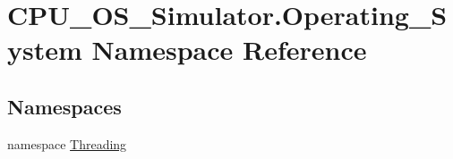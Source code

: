 \hypertarget{namespace_c_p_u___o_s___simulator_1_1_operating___system}{}\section{C\+P\+U\+\_\+\+O\+S\+\_\+\+Simulator.\+Operating\+\_\+\+System Namespace Reference}
\label{namespace_c_p_u___o_s___simulator_1_1_operating___system}
\subsection*{Namespaces}
\begin{DoxyCompactItemize}
\item 
namespace \hyperlink{namespace_c_p_u___o_s___simulator_1_1_operating___system_1_1_threading}{Threading}
\end{DoxyCompactItemize}
